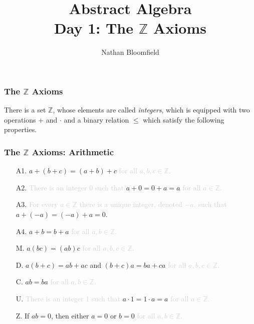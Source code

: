 \documentclass[handout]{beamer}
\begin{document}
\title{Abstract Algebra \\ Day 1: The $\mathbb{Z}$ Axioms}
\author{Nathan Bloomfield}

\begin{frame}
\titlepage
\end{frame}



\begin{frame}
\frametitle{The $\mathbb{Z}$ Axioms}
There is a set $\mathbb{Z}$, whose elements are called \emph{integers}, which is equipped with two operations $+$ and $\cdot$ and a binary relation $\leq$ which satisfy the following properties.
\end{frame}



\begin{frame}
\frametitle{The $\mathbb{Z}$ Axioms: Arithmetic}
\begin{itemize}
\item[A1.] $a+(b+c) = (a+b)+c$ \textcolor{lightgray}{for all $a,b,c \in \mathbb{Z}$.} \pause
\item[A2.] \textcolor{lightgray}{There is an integer 0 such that} $a + 0 = 0 + a = a$ \textcolor{lightgray}{for all $a \in \mathbb{Z}$.} \pause
\item[A3.] \textcolor{lightgray}{For every $a \in \mathbb{Z}$ there is a unique integer, denoted $-a$, such that} $a + (-a) = (-a) + a = 0$. \pause
\item[A4.] $a + b = b + a$ \textcolor{lightgray}{for all $a,b \in \mathbb{Z}$.} \pause
\item[M.] $a(bc) = (ab)c$ \textcolor{lightgray}{for all $a,b,c \in \mathbb{Z}$.} \pause
\item[D.] $a(b+c) = ab + ac$ and $(b+c)a = ba + ca$ \textcolor{lightgray}{for all $a,b,c \in \mathbb{Z}$.} \pause
\item[C.] $ab = ba$ \textcolor{lightgray}{for all $a,b \in \mathbb{Z}$.} \pause
\item[U.] \textcolor{lightgray}{There is an integer 1 such that} $a \cdot 1 = 1 \cdot a = a$ \textcolor{lightgray}{for all $a \in \mathbb{Z}$.} \pause
\item[Z.] If $ab = 0$, then either $a = 0$ or $b = 0$ \textcolor{lightgray}{for all $a,b \in \mathbb{Z}$.}
\end{itemize}
\end{frame}
\end{document}
